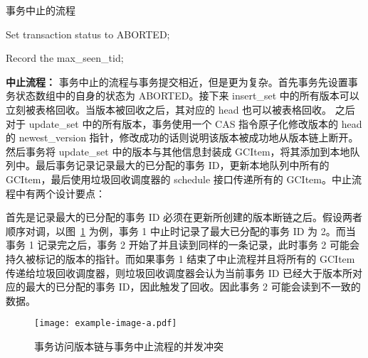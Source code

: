 \begin{algorithm}[h]
    \caption{事务中止的流程}
    \label{alg:abort}
    \BlankLine
    Set transaction status to ABORTED;



    Record the max\_seen\_tid;



\end{algorithm}

\textbf{中止流程：} 事务中止的流程与事务提交相近，但是更为复杂。首先事务先设置事务状态数组中的自身的状态为 ABORTED。接下来 insert\_set 中的所有版本可以立刻被表格回收。当版本被回收之后，其对应的 head 也可以被表格回收。
之后对于 update\_set 中的所有版本，事务使用一个 CAS 指令原子化修改版本的 head 的 newest\_version 指针，修改成功的话则说明该版本被成功地从版本链上断开。然后事务将 update\_set 中的版本与其他信息封装成 GCItem，将其添加到本地队列中。最后事务记录记录最大的已分配的事务 ID，更新本地队列中所有的 GCItem，最后使用垃圾回收调度器的 schedule 接口传递所有的 GCItem。中止流程中有两个设计要点：

首先是记录最大的已分配的事务 ID 必须在更新所创建的版本断链之后。假设两者顺序对调，以图~\ref{fig:update-abort-read} 为例，事务 1 中止时记录了最大已分配的事务 ID 为 2。而当事务 1 记录完之后，事务 2 开始了并且读到同样的一条记录，此时事务 2 可能会持久被标记的版本的指针。而如果事务 1 结束了中止流程并且将所有的 GCItem 传递给垃圾回收调度器，则垃圾回收调度器会认为当前事务 ID 已经大于版本所对应的最大的已分配的事务 ID，因此触发了回收。因此事务 2 可能会读到不一致的数据。

\begin{figure}
    \centering
    \texttt{[image: example-image-a.pdf]}
    \caption{事务访问版本链与事务中止流程的并发冲突}
    \label{fig:update-abort-read}
\end{figure}

